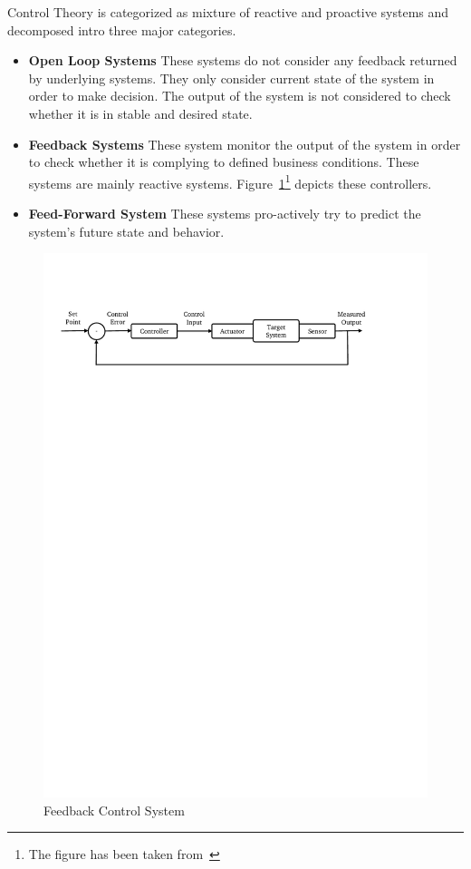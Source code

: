 Control Theory is categorized as mixture of reactive and proactive systems and decomposed intro three major categories.
\begin{itemize}
    \item \textbf{Open Loop Systems} These systems do not consider any feedback returned by underlying systems. They only consider current state of the system in order to make decision. The output of the system is not considered to check whether it is in stable and desired state.
    \item \textbf{Feedback Systems} These system monitor the output of the system in order to check whether it is complying to defined business conditions. These systems are mainly reactive systems. Figure~\ref{fig:feedback}\footnote{The figure has been taken from~\cite{Patikirikorala:2018}} depicts these controllers.
    \item \textbf{Feed-Forward System} These systems pro-actively try to predict the system's future state and behavior. 
\end{itemize}
\begin{figure}[h]
    \centering
    \includegraphics[clip, trim=1.2cm 23.5cm 3.4cm 3cm]{control.pdf}
    \caption{Feedback Control System}
    \label{fig:feedback}
\end{figure}
